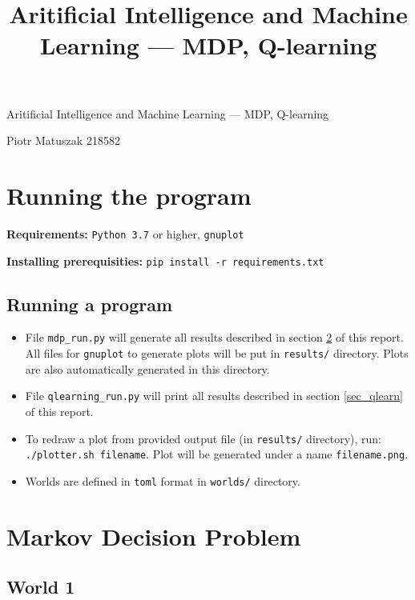 \documentclass[12pt,a4paper]{article} %
\title{Aritificial Intelligence and Machine Learning --- MDP, Q-learning}
\begin{document}
\begin{center}
\begin{LARGE}
\vspace{-40pt}
Aritificial Intelligence and Machine Learning --- MDP, Q-learning
\end{LARGE}
\vspace{10pt}

Piotr Matuszak 218582
\end{center}

\vspace{20pt}

\section{Running the program}

\textbf{Requirements:} \texttt{Python 3.7}  or higher, \texttt{gnuplot}

\noindent\textbf{Installing prerequisities:} \texttt{pip install -r requirements.txt}

\subsection{Running a program}

\begin{itemize}
\item File \texttt{mdp\_run.py} will generate all results described in section \ref{sec_mdp} of this report. All files for \texttt{gnuplot} to generate plots will be put in \texttt{results/} directory. Plots are also automatically generated in this directory.
\item File \texttt{qlearning\_run.py} will print all results described in section \ref{sec_qlearn} of this report.
\item To redraw a plot from provided output file (in \texttt{results/} directory), run: \texttt{./plotter.sh filename}. Plot will be generated under a name \texttt{filename.png}.
\item Worlds are defined in \texttt{toml} format in \texttt{worlds/} directory.
\end{itemize}

\section{Markov Decision Problem}\label{sec_mdp}

\subsection{World 1}
\end{document}
